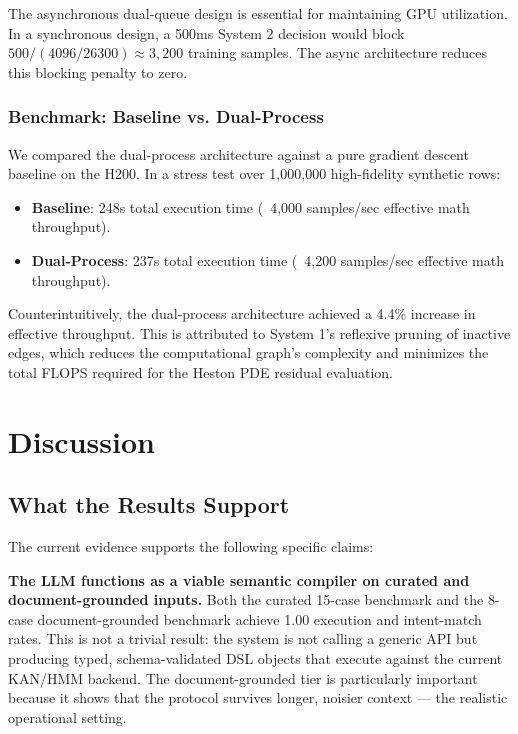 \documentclass[11pt,a4paper]{article}
\begin{document}
The asynchronous dual-queue design is essential for maintaining GPU utilization. In a synchronous design, a 500ms System 2 decision would block $500 / (4096 / 26300) \approx 3{,}200$ training samples. The async architecture reduces this blocking penalty to zero.

\subsubsection{Benchmark: Baseline vs. Dual-Process}
We compared the dual-process architecture against a pure gradient descent baseline on the H200. In a stress test over 1,000,000 high-fidelity synthetic rows:
\begin{itemize}
    \item \textbf{Baseline}: 248s total execution time (~4,000 samples/sec effective math throughput).
    \item \textbf{Dual-Process}: 237s total execution time (~4,200 samples/sec effective math throughput).
\end{itemize}
Counterintuitively, the dual-process architecture achieved a 4.4\% increase in effective throughput. This is attributed to System 1's reflexive pruning of inactive edges, which reduces the computational graph's complexity and minimizes the total FLOPS required for the Heston PDE residual evaluation.

\section{Discussion}
\label{sec:discussion}

\subsection{What the Results Support}

The current evidence supports the following specific claims:

\textbf{The LLM functions as a viable semantic compiler on curated and document-grounded inputs.} Both the curated 15-case benchmark and the 8-case document-grounded benchmark achieve 1.00 execution and intent-match rates. This is not a trivial result: the system is not calling a generic API but producing typed, schema-validated DSL objects that execute against the current KAN/HMM backend. The document-grounded tier is particularly important because it shows that the protocol survives longer, noisier context — the realistic operational setting.
\end{document}
